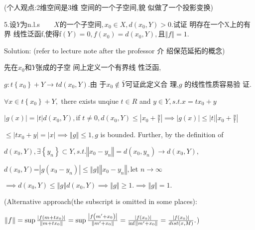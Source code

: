 \documentclass{article}
\begin{document}
\begin{CJK}{GBK}{song}
(个人观点:2维空间是3维%
空间的一个子空间,貌%
似做了一个投影变换)

\bigskip

5.设$Y$为n.l.s$\qquad X的 一 个 子 
空 间 ,x_{0}\in X,d\left( x_{0},Y\right) >0.$试证%
明存在一个X上的有界%
线性泛函f,使得f$\left( Y\right)
=0,f\left( x_{0}\right) =d\left( x_{0},Y\right) ,$且$\left\Vert
f\right\Vert =1.$

\bigskip Solution: (refer to lecture note after the professor 介%
绍保范延拓的概念)

先在$x_{0}$和$Y$张成的子空%
间上定义一个有界线%
性泛函,

$g:t\left\{ x_{0}\right\} +Y\rightarrow td\left( x_{0},Y\right) .$由%
于$x_{0}\notin \bar{Y}$可证此定义合%
理,$g$ 的线性性质容易验%
证.

\bigskip $\forall x\in t\left\{ x_{0}\right\} +Y,$ there exists unqiue $t\in
R$ and $y\in Y,s.t.x=tx_{0}+y$

$\left\vert g\left( x\right) \right\vert =\left\vert t\right\vert d\left(
x_{0},Y\right) ,$if $t\neq 0,d\left( x_{0},Y\right) \leq \left\vert x_{0}+%
\frac{y}{t}\right\vert \implies \left\vert g\left( x\right) \right\vert \leq
\left\vert t\right\vert \left\vert x_{0}+\frac{y}{t}\right\vert $

$\leq \left\vert tx_{0}+y\right\vert =\left\vert x\right\vert \implies
\left\Vert g\right\Vert \leq 1,g$ is bounded. Further, by the definition of

$d\left( x_{0},Y\right) ,\exists \left\{ y_{n}\right\} \subset
Y,s.t.\left\Vert x_{0}-y_{n}\right\Vert =d\left( x_{0},y_{n}\right)
\rightarrow d\left( x_{0},Y\right) ,$

$d\left( x_{0},Y\right) $=$\left\vert g\left( x_{0}-y_{n}\right) \right\vert
\leq \left\Vert g\right\Vert \left\Vert x_{0}-y_{n}\right\Vert ,$let $%
n\rightarrow \infty $

$\implies d\left( x_{0},Y\right) \leq \left\Vert g\right\Vert d\left(
x_{0},Y\right) \implies \left\Vert g\right\Vert \geq 1.\implies \left\Vert
g\right\Vert =1.$

\bigskip (Alternative approach(the subscript is omitted in some places):

$\left\Vert f\right\Vert =\sup \frac{\left\vert f\left( m+tx_{0}\right)
\right\vert }{\left\Vert m+tx_{0}\right\Vert }=\sup \frac{\left\vert f\left(
m^{\prime }+x_{0}\right) \right\vert }{\left\Vert m^{\prime
}+x_{0}\right\Vert }=\frac{\left\vert f\left( x_{0}\right) \right\vert }{%
\inf \left\Vert m^{\prime }+x_{0}\right\Vert }=\frac{\left\vert f\left(
x_{0}\right) \right\vert }{dist\left( x,M\right) }.$)


\end{CJK}
\end{document}
